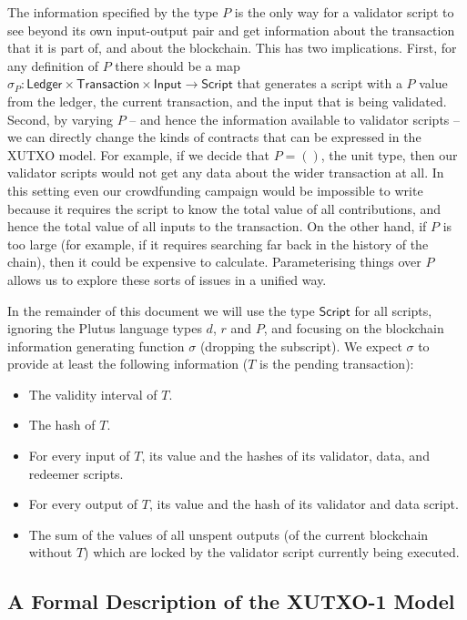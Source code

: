 \documentclass[a4paper]{article}
\theoremstyle{definition}  %
\begin{document}
The information specified by the type $P$ is the only way for a
validator script to see beyond its own input-output pair and get
information about the transaction that it is part of, and about the
blockchain. This has two implications. First, for any definition of
$P$ there should be a map $\sigma_P : \mathsf{Ledger} \times
\mathsf{Transaction} \times \mathsf{Input} \rightarrow
\mathsf{Script}$ that generates a script with a $P$ value from the
ledger, the current transaction, and the input that is being
validated. Second, by varying $P$ -- and hence the information
available to validator scripts -- we can directly change the kinds of
contracts that can be expressed in the XUTXO model. For example, if we
decide that $P = ()$, the unit type, then our validator scripts would
not get any data about the wider transaction at all. In this setting
even our crowdfunding campaign would be impossible to write because it
requires the script to know the total value of all contributions, and
hence the total value of all inputs to the transaction.  On the other
hand, if $P$ is too large (for example, if it requires searching far
back in the history of the chain), then it could be expensive to
calculate.  Parameterising things over $P$ allows us to explore these
sorts of issues in a unified way.

In the remainder of this document we will use the type
$\mathsf{Script}$ for all scripts, ignoring the Plutus language types
$d$, $r$ and $P$, and focusing on the blockchain information
generating function $\sigma$ (dropping the subscript).  We expect
$\sigma$ to provide at least the following information ($T$ is the
pending transaction):

\begin{itemize}
  
\item The validity interval of $T$.
\item The hash of $T$.
\item For every input of $T$, its value and the hashes of its
  validator, data, and redeemer scripts.
\item For every output of $T$, its value and the hash of its validator and
  data script.
\item The sum of the values of all unspent outputs (of the current
  blockchain without $T$) which are locked by the validator
  script currently being executed.
\end{itemize}

\subsection{A Formal Description of the XUTXO-1 Model}
\label{section:xutxo-spec}
\end{document}
